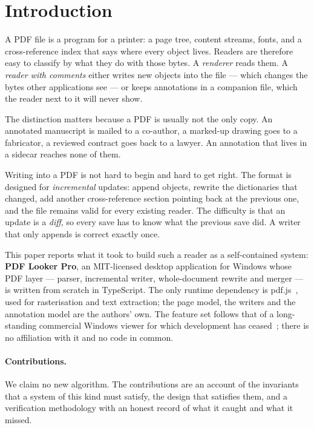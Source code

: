 \section{Introduction}
\label{sec:intro}

A PDF file is a program for a printer: a page tree, content streams, fonts, and a
cross-reference index that says where every object lives. Readers are therefore easy to
classify by what they do with those bytes. A \emph{renderer} reads them. A \emph{reader with
comments} either writes new objects into the file --- which changes the bytes other
applications see --- or keeps annotations in a companion file, which the reader next to it
will never show.

The distinction matters because a PDF is usually not the only copy. An annotated manuscript
is mailed to a co-author, a marked-up drawing goes to a fabricator, a reviewed contract goes
back to a lawyer. An annotation that lives in a sidecar reaches none of them.

Writing into a PDF is not hard to begin and hard to get right. The format is designed for
\emph{incremental} updates: append objects, rewrite the dictionaries that changed, add
another cross-reference section pointing back at the previous one, and the file remains valid
for every existing reader. The difficulty is that an update is a \emph{diff}, so every save
has to know what the previous save did. A writer that only appends is correct exactly once.

This paper reports what it took to build such a reader as a self-contained system:
\textbf{PDF Looker Pro}, an MIT-licensed desktop application for Windows whose PDF layer
--- parser, incremental writer, whole-document rewrite and merger --- is written from
scratch in TypeScript. The only runtime dependency is pdf.js~\cite{pdfjs}, used for
rasterisation and text extraction; the page model, the writers and the annotation model are
the authors' own. The feature set follows that of a long-standing commercial Windows viewer
for which development has ceased~\cite{pdfxchange}; there is no affiliation with it and no
code in common.

\paragraph{Contributions.} We claim no new algorithm. The contributions are an account of
the invariants that a system of this kind must satisfy, the design that satisfies them, and a
verification methodology with an honest record of what it caught and what it missed.

